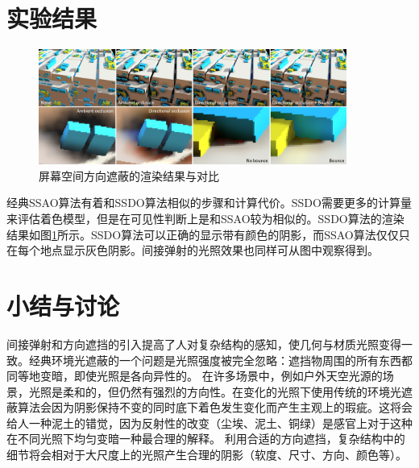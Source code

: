 \documentclass[10pt,a4paper]{article}
\theoremstyle{mythm}%
\numberwithin{equation}{section}
\begin{document}
\begin{CJK*}{UTF8}{song}
\section{实验结果}

\begin{figure}[htbp]
    \vspace{-3mm}
	\centering
  	\includegraphics[width=0.9\textwidth]{fig/result}
    \vspace{-4mm}
  	\caption{屏幕空间方向遮蔽的渲染结果与对比}
  	\label{fig:result}
    \vspace{-1mm}
\end{figure}

经典SSAO算法\cite{DBLP:conf/si3d/2007}有着和SSDO算法相似的步骤和计算代价。SSDO需要更多的计算量来评估着色模型，但是在可见性判断上是和SSAO较为相似的。SSDO算法的渲染结果如图\ref{fig:result}所示。SSDO算法可以正确的显示带有颜色的阴影，而SSAO算法仅仅只在每个地点显示灰色阴影。间接弹射的光照效果也同样可从图中观察得到。

\section{小结与讨论}

间接弹射和方向遮挡的引入提高了人对复杂结构的感知，使几何与材质光照变得一致。经典环境光遮蔽的一个问题是光照强度被完全忽略：遮挡物周围的所有东西都同等地变暗，即使光照是各向异性的。
在许多场景中，例如户外天空光源的场景，光照是柔和的，但仍然有强烈的方向性。在变化的光照下使用传统的环境光遮蔽算法会因为阴影保持不变的同时底下着色发生变化而产生主观上的瑕疵。这将会给人一种泥土的错觉，因为反射性的改变（尘埃、泥土、铜绿）是感官上对于这种在不同光照下均匀变暗一种最合理的解释。
利用合适的方向遮挡，复杂结构中的细节将会相对于大尺度上的光照产生合理的阴影（软度、尺寸、方向、颜色等）。



\end{CJK*}
\end{document}

